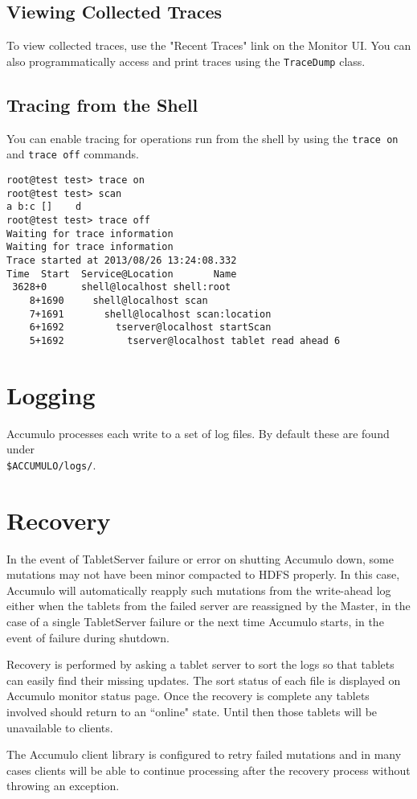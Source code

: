 \subsection{Viewing Collected Traces}
To view collected traces, use the "Recent Traces" link on the Monitor
UI. You can also programmatically access and print traces using the
\texttt{TraceDump} class.

\subsection{Tracing from the Shell}
You can enable tracing for operations run from the shell by using the
\texttt{trace on} and \texttt{trace off} commands.

\begin{verbatim}
root@test test> trace on
root@test test> scan
a b:c []    d
root@test test> trace off
Waiting for trace information
Waiting for trace information
Trace started at 2013/08/26 13:24:08.332
Time  Start  Service@Location       Name
 3628+0      shell@localhost shell:root
    8+1690     shell@localhost scan
    7+1691       shell@localhost scan:location
    6+1692         tserver@localhost startScan
    5+1692           tserver@localhost tablet read ahead 6
\end{verbatim}

\section{Logging}
Accumulo processes each write to a set of log files. By default these are found under\\
\texttt{\$ACCUMULO/logs/}.

\section{Recovery}

In the event of TabletServer failure or error on shutting Accumulo down, some
mutations may not have been minor compacted to HDFS properly. In this case,
Accumulo will automatically reapply such mutations from the write-ahead log
either when the tablets from the failed server are reassigned by the Master, in the
case of a single TabletServer failure or the next time Accumulo starts, in the event of
failure during shutdown.

Recovery is performed by asking a tablet server to sort the logs so that tablets can easily find their missing
updates. The sort status of each file is displayed on
Accumulo monitor status page. Once the recovery is complete any
tablets involved should return to an ``online" state. Until then those tablets will be
unavailable to clients.

The Accumulo client library is configured to retry failed mutations and in many
cases clients will be able to continue processing after the recovery process without
throwing an exception.

